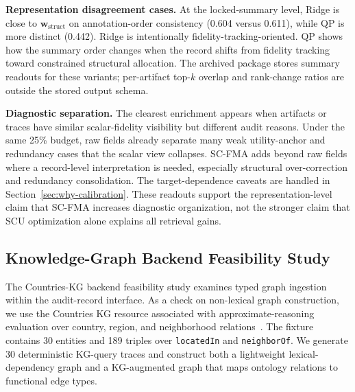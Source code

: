\documentclass[a4paper,fleqn]{cas-sc}
\newcommand{\wstruct}{\ensuremath{\mathbf{w}_{\mathrm{struct}}}}
\begin{document}
\textbf{Representation disagreement cases.} At the locked-summary level, Ridge is close to \wstruct{} on annotation-order consistency (0.604 versus 0.611), while QP is more distinct (0.442). Ridge is intentionally fidelity-tracking-oriented. QP shows how the summary order changes when the record shifts from fidelity tracking toward constrained structural allocation. The archived package stores summary readouts for these variants; per-artifact top-$k$ overlap and rank-change ratios are outside the stored output schema.

\textbf{Diagnostic separation.} The clearest enrichment appears when artifacts or traces have similar scalar-fidelity visibility but different audit reasons. Under the same 25\% budget, raw fields already separate many weak utility-anchor and redundancy cases that the scalar view collapses. SC-FMA adds beyond raw fields where a record-level interpretation is needed, especially structural over-correction and redundancy consolidation. The target-dependence caveats are handled in Section~\ref{sec:why-calibration}. These readouts support the representation-level claim that SC-FMA increases diagnostic organization, not the stronger claim that SCU optimization alone explains all retrieval gains.

\subsection{Knowledge-Graph Backend Feasibility Study}
\label{sec:kg-pilot}

The Countries-KG backend feasibility study examines typed graph ingestion within the audit-record interface. As a check on non-lexical graph construction, we use the Countries KG resource associated with approximate-reasoning evaluation over country, region, and neighborhood relations~\cite{bouchard2015approximate}. The fixture contains 30 entities and 189 triples over \texttt{locatedIn} and \texttt{neighborOf}. We generate 30 deterministic KG-query traces and construct both a lightweight lexical-dependency graph and a KG-augmented graph that maps ontology relations to functional edge types.
\end{document}
